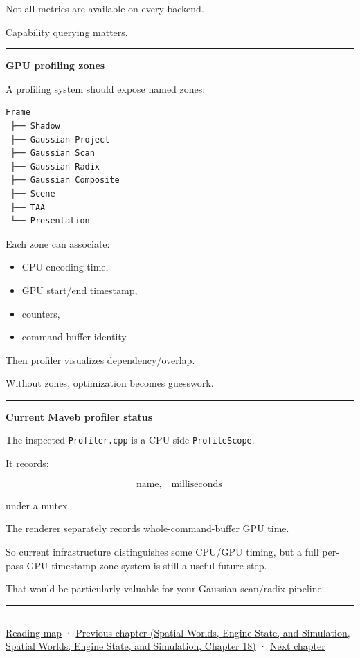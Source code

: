 Not all metrics are available on every backend.

Capability querying matters.

\begin{center}\rule{0.5\linewidth}{0.5pt}\end{center}

\textbf{GPU profiling zones}

A profiling system should expose named zones:

\protect{}\label{p10-zones}%
\begin{verbatim}
Frame
 ├── Shadow
 ├── Gaussian Project
 ├── Gaussian Scan
 ├── Gaussian Radix
 ├── Gaussian Composite
 ├── Scene
 ├── TAA
 └── Presentation
\end{verbatim}

Each zone can associate:

\begin{itemize}
\tightlist
\item
  CPU encoding time,
\item
  GPU start/end timestamp,
\item
  counters,
\item
  command-buffer identity.
\end{itemize}

Then profiler visualizes dependency/overlap.

Without zones, optimization becomes guesswork.

\begin{center}\rule{0.5\linewidth}{0.5pt}\end{center}

\textbf{Current Maveb profiler status}

The inspected \texttt{Profiler.cpp} is a CPU-side \texttt{ProfileScope}.

It records:

\[
\text{name},
\quad
\text{milliseconds}
\]

under a mutex.

The renderer separately records whole-command-buffer GPU time.

So current infrastructure distinguishes some CPU/GPU timing, but a full per-pass GPU timestamp-zone system is still a useful future step.

That would be particularly valuable for your Gaussian scan/radix pipeline.

\begin{center}\rule{0.5\linewidth}{0.5pt}\end{center}

\begin{center}\rule{0.5\linewidth}{0.5pt}\end{center}

\hyperref[volume-reading-map]{Reading map} · \href{../05-Spatial-Worlds-Engine-State-and-Simulation/main.pdf\#nameddest=05-engine-i-ch018-ecs-contracts-diagnostics-and-gpu-handoff}{Previous chapter (Spatial Worlds, Engine State, and Simulation, Spatial Worlds, Engine State, and Simulation, Chapter 18)} · \hyperref[05-engine-i-ch020-gpu-performance-models-and-principled-redesign]{Next chapter}
